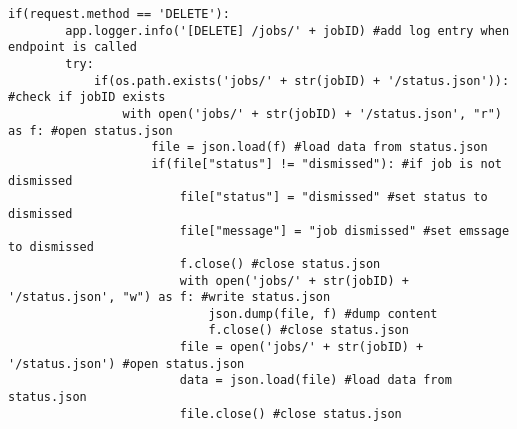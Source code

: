 \begin{lstlisting}[caption={Job Endpoint}, style = Python]
    if(request.method == 'DELETE'):
        app.logger.info('[DELETE] /jobs/' + jobID) #add log entry when endpoint is called
        try:       
            if(os.path.exists('jobs/' + str(jobID) + '/status.json')): #check if jobID exists
                with open('jobs/' + str(jobID) + '/status.json', "r") as f: #open status.json
                    file = json.load(f) #load data from status.json
                    if(file["status"] != "dismissed"): #if job is not dismissed
                        file["status"] = "dismissed" #set status to dismissed
                        file["message"] = "job dismissed" #set emssage to dismissed
                        f.close() #close status.json
                        with open('jobs/' + str(jobID) + '/status.json', "w") as f: #write status.json
                            json.dump(file, f) #dump content
                            f.close() #close status.json                    
                        file = open('jobs/' + str(jobID) + '/status.json') #open status.json
                        data = json.load(file) #load data from status.json 
                        file.close() #close status.json
                        

\end{lstlisting}
